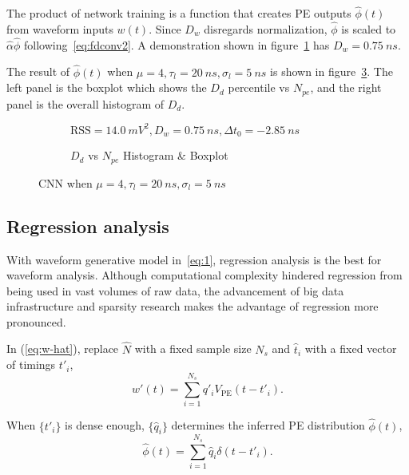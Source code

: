 The product of network training is a function that creates PE outputs $\hat{\phi}(t)$ from waveform inputs $w(t)$.  Since $D_w$ disregards normalization, $\hat{\phi}$ is scaled to $\hat{\alpha}\hat{\phi}$ following~\eqref{eq:fdconv2}. A demonstration shown in figure~\ref{fig:cnn} has $D_w = \SI{0.75}{ns}$. 

The result of $\hat{\phi}(t)$ when $\mu=4, \tau_l=\SI{20}{ns}, \sigma_l=\SI{5}{ns}$ is shown in figure~\ref{fig:cnn-npe}. The left panel is the boxplot which shows the $D_d$ percentile vs $N_{pe}$, and the right panel is the overall histogram of $D_d$. 

\begin{figure}[H]
  \begin{subfigure}{.5\textwidth}
    \centering
    \resizebox{\textwidth}{!}{}
    \caption{\label{fig:cnn}$\mathrm{RSS}=\SI{14.0}{mV^2},D_w=\SI{0.75}{ns},\Delta t_0=\SI{-2.85}{ns}$}
  \end{subfigure}
  \begin{subfigure}{.5\textwidth}
    \centering
    \resizebox{\textwidth}{!}{}
    \caption{\label{fig:cnn-npe} $D_d$ vs $N_{pe}$ Histogram \& Boxplot}
  \end{subfigure}
  \caption{CNN when $\mu=4, \tau_l=\SI{20}{ns}, \sigma_l=\SI{5}{ns}$}
\end{figure}

\subsection{Regression analysis}
With waveform generative model in~\eqref{eq:1}, regression analysis is the best for waveform analysis.  Although computational complexity hindered regression from being used in vast volumes of raw data, the advancement of big data infrastructure and sparsity research makes the advantage of regression more pronounced.

In (\ref{eq:w-hat}), replace $\hat{N}$ with a fixed sample size $N_s$ and $\hat{t}_i$ with a fixed vector of timings $t'_i$,
\begin{equation}
  \label{eq:gd}
  w'(t) = \sum_{i=1}^{N_s}q'_iV_\mathrm{PE}(t-t'_i).
\end{equation}

When $\{t'_i\}$ is dense enough, $\{\hat{q}_i\}$ determines the inferred PE distribution $\hat{\phi}(t)$,
\begin{equation}
  \label{eq:gd-phi}
  \hat{\phi}(t) = \sum_{i=1}^{N_s}\hat{q}_i\delta(t-t'_i).
\end{equation}

